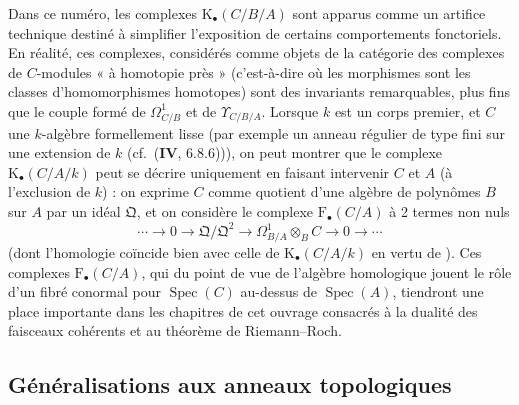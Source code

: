 \begin{remark}[20.6.26]
\label{0.20.6.26-fr}
Dans ce numéro, les complexes $\mathrm{K}_\bullet(C/B/A)$ sont apparus comme
un artifice technique destiné à simplifier l'exposition de certains
comportements fonctoriels. En réalité, ces complexes, considérés comme objets
de la catégorie des
complexes de $C$-modules « à homotopie près » (c'est-à-dire où les morphismes
sont les classes d'homomorphismes homotopes) sont des invariants remarquables,
plus fins que le couple formé de $\Omega^1_{C/B}$ et de
$\Upsilon_{C/B/A}$. Lorsque $k$ est un corps premier, et $C$ une $k$-algèbre
formellement lisse (par exemple un anneau régulier de type fini sur une
extension de $k$ (cf.\ ($\mathbf{IV}$, 6.8.6))), on peut montrer que le
complexe $\mathrm{K}_\bullet(C/A/k)$ peut se décrire uniquement en faisant
intervenir $C$ et $A$ (à l'exclusion de $k$) : on exprime $C$ comme quotient
d'une algèbre de polynômes $B$ sur $A$ par un idéal $\mathfrak{Q}$, et on
considère le complexe $\mathrm{F}_\bullet(C/A)$ à 2 termes non nuls
\[
  \cdots\to0\to\mathfrak{Q}/\mathfrak{Q}^2\to
  \Omega^1_{B/A}\otimes_B C\to0\to\cdots
\]
(dont l'homologie coïncide bien avec celle de
$\mathrm{K}_\bullet(C/A/k)$ en vertu de ). Ces
complexes $\mathrm{F}_\bullet(C/A)$, qui du point de vue de l'algèbre
homologique jouent le rôle d'un fibré conormal pour $\operatorname{Spec}(C)$
au-dessus de $\operatorname{Spec}(A)$, tiendront une place importante dans
les chapitres de cet ouvrage consacrés à la dualité des faisceaux cohérents et
au théorème de Riemann--Roch.
\end{remark}

\subsection{Généralisations aux anneaux topologiques}
\label{subsection:0.20.7-fr}

